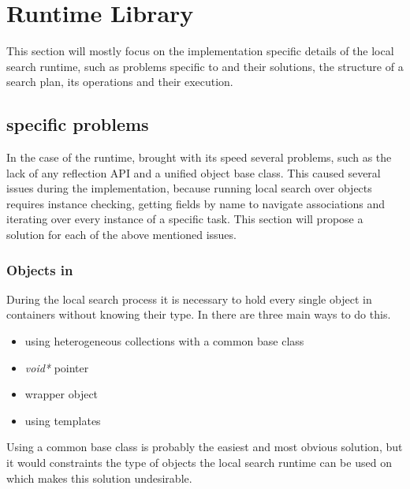 \section{Runtime Library}

This section will mostly focus on the implementation specific details of the
\CPP{} local search runtime, such as problems specific to \CPP{} and their
solutions, the structure of a search plan, its operations and their execution.

\subsection{\CPP{} specific problems}\label{sect:CppSpecificProblems}

In the case of the runtime, \CPP{} brought with its speed several problems, such
as the lack of any reflection API and a unified object base class. This caused
several issues during the implementation, because running local search over \CPP{}
objects requires instance checking, getting fields by name to navigate
associations and iterating over every instance of a specific task. This section
will propose a solution for each of the above mentioned issues.

\subsubsection{Objects in \CPP{}}\label{sect:ObjectsInCpp}

During the local search process it is necessary to hold every single object in
containers without knowing their type. In \CPP{} there are three main ways to do
this.

\begin{itemize}
  \item using heterogeneous collections with a common base class
  \item \emph{void*} pointer
  \item wrapper object
  \item using templates
\end{itemize}

Using a common base class is probably the easiest and most obvious solution,
but it would constraints the type of objects the local search runtime can
be used on which makes this solution undesirable.

